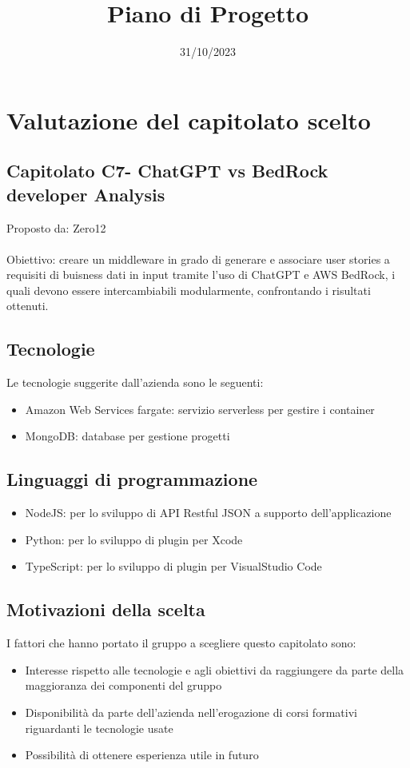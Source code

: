 \documentclass[12pt]{article}
\title{Piano di Progetto}
\date{31/10/2023}
\begin{document}
\maketitle

\section{Valutazione del capitolato scelto}
\subsection{Capitolato C7- ChatGPT vs BedRock developer Analysis}
Proposto da: Zero12\\ \\
Obiettivo: creare un middleware in grado di generare e associare user stories a requisiti di buisness dati in input tramite l’uso di ChatGPT e AWS BedRock, i quali devono essere intercambiabili modularmente, confrontando i risultati ottenuti.
\subsection{Tecnologie}
Le tecnologie suggerite dall’azienda sono le seguenti:
\begin{itemize}
    \item Amazon Web Services fargate: servizio serverless per gestire i container
    \item MongoDB: database per gestione progetti
\end{itemize}
\subsection{Linguaggi di programmazione}
\begin{itemize}
    \item NodeJS: per lo sviluppo di API Restful JSON a supporto dell’applicazione
    \item Python: per lo sviluppo di plugin per Xcode
    \item TypeScript: per lo sviluppo di plugin per VisualStudio Code
\end{itemize}
\subsection{Motivazioni della scelta}
I fattori che hanno portato il gruppo a scegliere questo capitolato sono:
\begin{itemize}
    \item Interesse rispetto alle tecnologie e agli obiettivi da raggiungere da parte della maggioranza dei componenti del gruppo
    \item Disponibilità da parte dell’azienda nell’erogazione di corsi formativi riguardanti le tecnologie usate 
    \item Possibilità di ottenere esperienza utile in futuro
\end{itemize}
\end{document}
